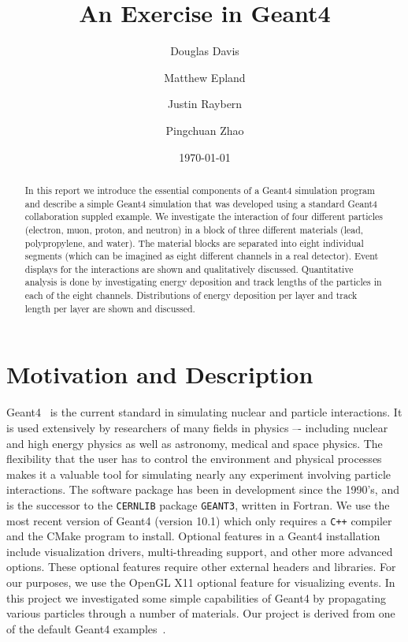 \documentclass[aps,prd,twocolumn,nofootinbib]{revtex4-1}
\begin{document}
\title{An Exercise in Geant4}
\author{Douglas Davis}
\author{Matthew Epland}
\author{Justin Raybern}
\author{Pingchuan Zhao}
\date{\today}
\begin{abstract}
In this report we introduce the essential components of a Geant4 simulation program and describe a simple Geant4 simulation that was developed using a standard Geant4 collaboration suppled example. We investigate the interaction of four different particles (electron, muon, proton, and neutron) in a block of three different materials (lead, polypropylene, and water). The material blocks are separated into eight individual segments (which can be imagined as eight different channels in a real detector). Event displays for the interactions are shown and qualitatively discussed. Quantitative analysis is done by investigating energy deposition and track lengths of the particles in each of the eight channels. Distributions of energy deposition per layer and track length per layer are shown and discussed.
\end{abstract}\maketitle
\section{Motivation and Description}
\label{sec1}
Geant4~\cite{geant} is the current standard in simulating nuclear and particle interactions. It is used extensively by researchers of many fields in physics –- including nuclear and high energy physics as well as astronomy, medical and space physics. The flexibility that the user has to control the environment and physical processes makes it a valuable tool for simulating nearly any experiment involving particle interactions. The software package has been in development since the 1990's, and is the successor to the \texttt{CERNLIB} package \texttt{GEANT3}, written in Fortran. We use the most recent version of Geant4 (version 10.1) which only requires a \texttt{C++} compiler and the CMake program to install. Optional features in a Geant4 installation include visualization drivers, multi-threading support, and other more advanced options. These optional features require other external headers and libraries. For our purposes, we use the OpenGL X11 optional feature for visualizing events. In this project we investigated some simple capabilities of Geant4 by propagating various particles through a number of materials. Our project is derived from one of the default Geant4 examples~\cite{G4_tutorials}.
\end{document}
